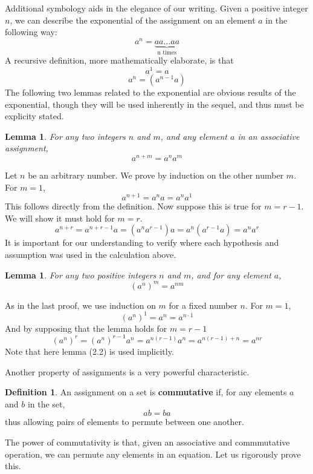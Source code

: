 \documentclass[12pt]{amsbook}
\makeatletter
\theoremstyle{plain}
\newtheorem{lemma}[theorem]{Lemma}
\theoremstyle{definition}
\newtheorem{definition}{Definition}
\renewenvironment{proof}[1][\proofname]{\par
  \pushQED{\qed}%
  \normalfont \topsep6\p@\@plus6\p@\relax
  \list{}{\leftmargin=0em
          \rightmargin=\leftmargin
          \settowidth{\itemindent}{\itshape#1}%
          \labelwidth=\itemindent}

  \item[\hskip\labelsep
        \itshape
    #1\@addpunct{.}]\ignorespaces
}{%
  \popQED\endlist\@endpefalse
}
\makeatother
\begin{document}
Additional symbology aids in the elegance of our writing. Given a positive integer $n$, we can describe the exponential of the assignment on an element $a$ in the following way:
%
\[ a^n = \underbrace{aa \dots aa}_\text{n times} \]
%
A recursive definition, more mathematically elaborate, is that
%
\[ a^1 = a \]
\[ a^n = (a^{n-1}a) \]
%
The following two lemmas related to the exponential are obvious results of the exponential, though they will be used inherently in the sequel, and thus must be explicity stated.

\begin{lemma} For any two integers $n$ and $m$, and any element $a$ in an associative assignment,
\[ a^{n+m} = a^n a^m \]
\end{lemma}
\begin{proof}
    Let $n$ be an arbitrary number. We prove by induction on the other number $m$. For $m = 1$,
    \[ a^{n + 1} = a^n a = a^n a^1 \]
    This follows directly from the definition. Now suppose this is true for $m = r - 1$. We will show it must hold for $m = r$.
    \[ a^{n + r} = a^{n + r - 1} a = (a^n a^{r-1}) a = a^n(a^{r-1}a) = a^n a^r \]
    It is important for our understanding to verify where each hypothesis and assumption was used in the calculation above.
\end{proof}

\begin{lemma}
    For any two positive integers $n$ and $m$, and for any element $a$,
    \[ (a^n)^m = a^{nm} \]
\end{lemma}
\begin{proof}
    As in the last proof, we use induction on $m$ for a fixed number $n$. For $m = 1$,
    \[ (a^n)^1 = a^n = a^{n \cdotp 1} \]
    And by supposing that the lemma holds for $m = r-1$
    \[ (a^n)^r = (a^n)^{r-1} a^n = a^{n(r-1)} a^n = a^{n(r-1) + n} = a^{nr} \]
    Note that here lemma (2.2) is used implicitly.
\end{proof}

Another property of assignments is a very powerful characteristic.

\begin{definition} An assignment on a set is {\bf commutative} if, for any elements $a$ and $b$ in the set,
%
\[ ab = ba \]
%
thus allowing pairs of elements to permute between one another.
\end{definition}

The power of commutativity is that, given an associative and commmutative operation, we can permute any elements in an equation. Let us rigorously prove this.
\end{document}
